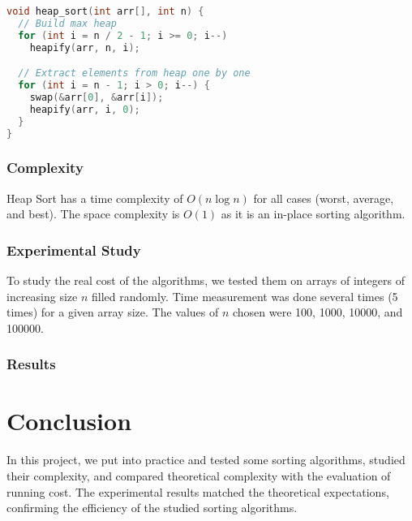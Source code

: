 \documentclass{article}
\begin{document}
\begin{lstlisting}[language=C, caption=Matrix Multiplication]
void heap_sort(int arr[], int n) {
  // Build max heap
  for (int i = n / 2 - 1; i >= 0; i--)
    heapify(arr, n, i);

  // Extract elements from heap one by one
  for (int i = n - 1; i > 0; i--) {
    swap(&arr[0], &arr[i]);
    heapify(arr, i, 0);
  }
}
\end{lstlisting}

\subsubsection{Complexity}
Heap Sort has a time complexity of $O(n \log n)$ for all cases (worst, average, and best). The space complexity is $O(1)$ as it is an in-place sorting algorithm.

\subsubsection{Experimental Study}
To study the real cost of the algorithms, we tested them on arrays of integers of increasing size $n$ filled randomly. Time measurement was done several times (5 times) for a given array size. The values of $n$ chosen were 100, 1000, 10000, and 100000.

\subsubsection{Results}
\begin{figure}[ht]
\end{figure}

\section{Conclusion}
In this project, we put into practice and tested some sorting algorithms, studied their complexity, and compared theoretical complexity with the evaluation of running cost. The experimental results matched the theoretical expectations, confirming the efficiency of the studied sorting algorithms.
\end{document}
